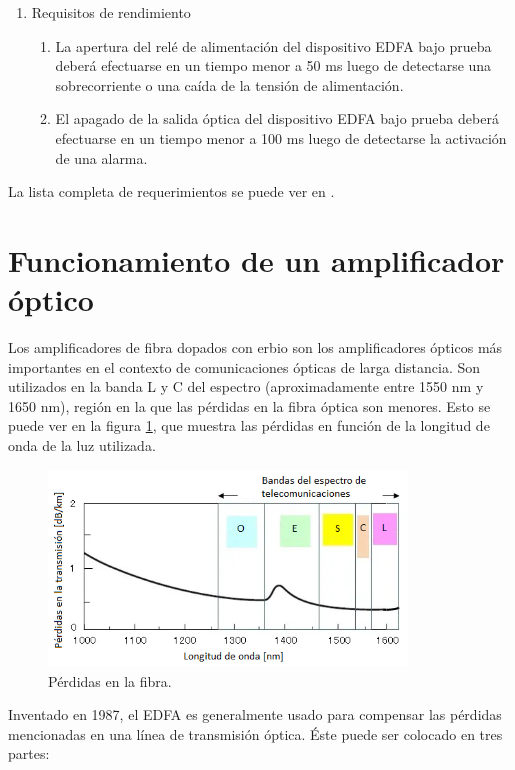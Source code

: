 \begin{enumerate}
\item Requisitos de rendimiento
	\begin{enumerate}
	\item La apertura del relé de alimentación del dispositivo EDFA 		bajo prueba deberá efectuarse en un tiempo menor a 50 ms luego de 		detectarse una sobrecorriente o una caída de la tensión de 				alimentación.
	\item El apagado de la salida óptica del dispositivo EDFA bajo 			prueba deberá efectuarse en un tiempo menor a 100 ms luego de 			detectarse la activación de una alarma.
	\end{enumerate}
	
\end{enumerate}

La lista completa de requerimientos se puede ver en \citep{DOC_REQ}.

\section{Funcionamiento de un amplificador óptico}
\label{sec:funcAmp}

Los amplificadores de fibra dopados con erbio son los amplificadores ópticos más importantes en el contexto de comunicaciones ópticas de larga distancia. Son utilizados en la banda L y C del espectro (aproximadamente entre 1550 nm y 1650 nm), región en la que las pérdidas en la fibra óptica son menores. Esto se puede ver en la figura \ref{fig:espectro}, que muestra las pérdidas en función de la longitud de onda de la luz utilizada.

\begin{figure}[H]
\centering
\includegraphics[width=0.85\textwidth]{./Figures/espectro.png}
\caption{Pérdidas en la fibra.}
\label{fig:espectro}
\end{figure}

Inventado en 1987, el EDFA es generalmente usado para compensar las pérdidas mencionadas en una línea de transmisión óptica. Éste puede ser colocado en tres partes: 

